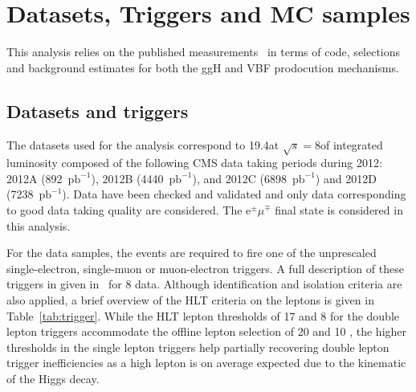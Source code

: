 \section{Datasets, Triggers and MC samples}
\label{sec:Datasets}

This analysis relies on the published \hww measurements~\cite{Chatrchyan:2013iaa} in terms of code, selections and background estimates for both the ggH and VBF prodocution mechanisms.

\subsection{Datasets and triggers\label{subsec:Datasets}}

The datasets used for the analysis correspond to 19.4\ifb at $\sqrt{s}=8$\TeV  of integrated luminosity composed of the following CMS data taking periods during 2012: 2012A (892~$\mathrm{pb}^{-1}$), 2012B (4440~$\mathrm{pb}^{-1}$), and 2012C (6898~$\mathrm{pb}^{-1}$) and 2012D (7238~$\mathrm{pb}^{-1}$).
Data have been checked and validated and only data corresponding to good data taking quality are considered.
The $\mathrm{e}^{\pm}\mu^{\mp}$ final state is considered in this analysis.

For the data samples, the events are required to fire one of the unprescaled
single-electron, single-muon or muon-electron triggers.
A full description of these triggers in given in~\cite{AN-2012-228} for 8 \TeV data. Although identification and isolation criteria are
also applied, a brief overview of the HLT \pt criteria on the leptons
is given in Table~\ref{tab:trigger}. While the HLT lepton \pt thresholds of 17 and 8 \GeV for the double
lepton triggers accommodate the offline lepton \pt selection of 20 and 10 \GeV, the higher \pt thresholds
in the single lepton triggers help partially recovering double lepton trigger inefficiencies
as a high \pt lepton is on average expected due to the kinematic of the Higgs decay. 

